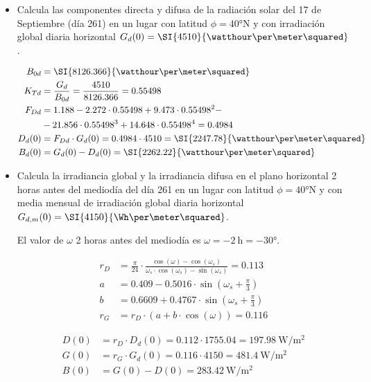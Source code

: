 \begin{itemize}
\item Calcula las componentes directa y difusa de la radiación solar
  del 17 de Septiembre (día 261) en un lugar con latitud
  $\phi=\ang{40}\mathrm{N}$ y con irradiación global diaria horizontal
  $G_d(0)=\SI{4510}{\watthour\per\meter\squared}$.

\begin{align*}
  B_{0d} &= \SI{8126.366}{\watthour\per\meter\squared}\\
  K_{Td} &= \frac{G_{d}}{B_{0d}} = \frac{4510}{8126.366} = 0.55498\\
  F_{Dd} &= 1.188 - 2.272 \cdot 0.55498 + 9.473 \cdot 0.55498^{2} -\\
         &- 21.856 \cdot 0.55498^{3} + 14.648 \cdot 0.55498^{4} = 0.4984\\
  D_d(0) &= F_{Dd} \cdot G_d(0) = 0.4984 \cdot 4510 = \SI{2247.78}{\watthour\per\meter\squared}\\
  B_d(0) &= G_d(0) - D_d(0) = \SI{2262.22}{\watthour\per\meter\squared}
\end{align*}


\item Calcula la irradiancia global y la irradiancia difusa en el
  plano horizontal 2 horas antes del mediodía del día 261 en un lugar
  con latitud $\phi=\ang{40}\mathrm{N}$ y con media mensual de
  irradiación global diaria horizontal
  $G_{d,m}(0)=\SI{4150}{\Wh\per\meter\squared}$.

  El valor de $\omega$ 2 horas antes del mediodía es
  $\omega = \SI{-2}{\hour} = \ang{-30}.$

\begin{align*}
  r_{D} &= \frac{\pi}{24}\cdot\frac{\cos(\omega)-\cos(\omega_{s})}{\omega_{s}\cdot\cos(\omega_{s})-\sin(\omega_{s})} = 0.113\\
  a &= 0.409-0.5016\cdot\sin(\omega_{s}+\frac{\pi}{3})\\
  b &= 0.6609+0.4767\cdot\sin(\omega_{s}+\frac{\pi}{3})\\
  r_{G} &= r_{D}\cdot\left(a + b\cdot\cos(\omega)\right) = 0.116
\end{align*}

\begin{align*}
  D(0) &= r_D \cdot D_{d}(0) = 0.112 \cdot 1755.04 = \SI{197.98}{\watt\per\meter\squared}\\
  G(0) &= r_G \cdot G_{d}(0) = 0.116 \cdot 4150 = \SI{481.4}{\watt\per\meter\squared}\\
  B(0) &= G(0) - D(0) = \SI{283.42}{\watt\per\meter\squared}
\end{align*}
\end{itemize}
